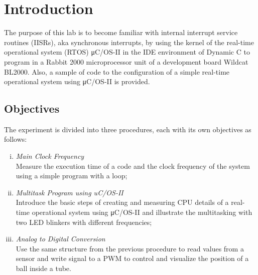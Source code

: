 \section{Introduction}

The purpose of this lab is to become familiar with internal interrupt service routines (IISRs), aka synchronous interrupts, by using the kernel of the real-time operational system (RTOS) μC/OS-II in the IDE environment of Dynamic C to program in a Rabbit 2000 microprocessor unit of a development board Wildcat BL2000. Also, a sample of code to the configuration of a simple real-time operational system using μC/OS-II is provided.

\subsection{Objectives}
The experiment is divided into three procedures, each with its own objectives as follows:

\begin{enumerate}[(i)]
\item
\textit{Main Clock Frequency}\\
Measure the execution time of a code and the clock frequency of the system using a simple program with a loop;
\\
\item
\textit{Multitask Program using uC/OS-II}\\
Introduce the basic steps of creating and measuring CPU details of a real-time operational system using μC/OS-II and illustrate the multitasking with two LED blinkers with different frequencies;
\\
\item
\textit{Analog to Digital Conversion}
\\Use the same structure from the previous procedure to read values from a sensor and write signal to a PWM to control and visualize the position of a ball inside a tube.
\\
\end{enumerate}

\begin{lstlisting}[frame=single]
\end{lstlisting}
